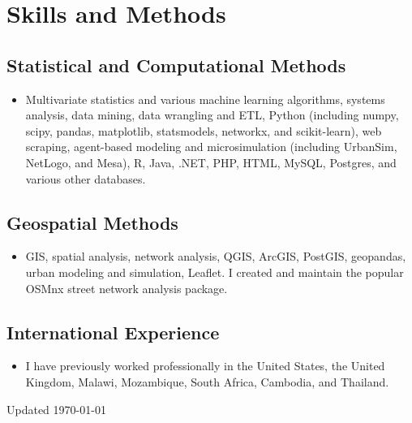 \documentclass{academiccv}
\begin{document}
\section*{Skills and Methods}

\subsection*{Statistical and Computational Methods}

\begin{itemize}
\item Multivariate statistics and various machine learning algorithms, systems analysis, data mining, data wrangling and ETL, Python (including numpy, scipy, pandas, matplotlib, statsmodels, networkx, and scikit-learn), web scraping, agent-based modeling and microsimulation (including UrbanSim, NetLogo, and Mesa), R, Java, .NET, PHP, HTML, MySQL, Postgres, and various other databases.
\end{itemize}

\subsection*{Geospatial Methods}

\begin{itemize}
\item GIS, spatial analysis, network analysis, QGIS, ArcGIS, PostGIS, geopandas, urban modeling and simulation, Leaflet. I created and maintain the popular OSMnx street network analysis package.
\end{itemize}

\subsection*{International Experience}

\begin{itemize}
\item I have previously worked professionally in the United States, the United Kingdom, Malawi, Mozambique, South Africa, Cambodia, and Thailand.
\end{itemize}



\begin{center}
\vspace{6em}
Updated \monthyeardate\today
\end{center}
\end{document}

